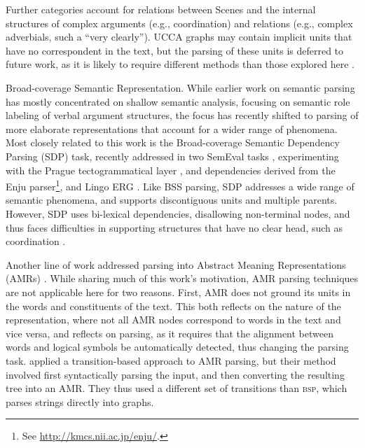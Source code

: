 \documentclass[11pt]{article}
\makeatletter
\renewcommand{\paragraph}{
  \@startsection{paragraph}{4}
  {\z@}{.5ex \@plus .5ex \@minus .2ex}{-1em}
  {\normalfont\normalsize\bfseries}
}
\makeatother
\begin{document}
Further categories account for relations between Scenes and the internal structures of
complex arguments (e.g., coordination) and relations
(e.g., complex adverbials, such a ``very clearly''). UCCA graphs may contain implicit
units that have no correspondent in the text, but the parsing of these
units is deferred to future work, as it is likely to require different methods
than those explored here \cite{roth2015inducing}.


\paragraph{Broad-coverage Semantic Representation.}
While earlier work on semantic parsing has mostly concentrated on shallow semantic analysis,
focusing on semantic role labeling of verbal argument structures,
the focus has recently shifted to parsing of more elaborate representations that account
for a wider range of phenomena. 
Most closely related to this work is the Broad-coverage Semantic Dependency Parsing (SDP) task,
recently addressed in two SemEval tasks \cite{oepen2014semeval,oepen2015semeval},
experimenting with the Prague tectogrammatical layer \cite{bohmova2003prague},
and dependencies derived from the Enju parser\footnote{See \url{http://kmcs.nii.ac.jp/enju/}.},
and Lingo ERG \cite{Flic:02}.
Like BSS parsing, SDP addresses a wide range of semantic phenomena,
and supports discontiguous units and multiple parents. However, SDP uses
bi-lexical dependencies, disallowing non-terminal nodes, and thus faces difficulties in supporting
structures that have no clear head, such as coordination \cite{Ivanova2012who}.

Another line of work addressed parsing into Abstract Meaning Representations (AMRs)
\cite{flanigan2014discriminative,vanderwende2015amr,pust2015parsing,artzi2015broad}. 
While sharing much of this work's motivation, AMR parsing techniques are not applicable
here for two reasons. 
First, AMR does not ground its units in the words and constituents of the text.
This both reflects on the nature of the representation,
where not all AMR nodes correspond to words in the text and vice versa, and reflects
on parsing, as it requires that the alignment between words and logical symbols be
automatically detected, thus changing the parsing task.
 applied a transition-based approach to AMR parsing,
but their method involved first syntactically parsing the input, and then converting
the resulting tree into an AMR. They thus used a different set of transitions than
\textsc{bsp}, which parses strings directly into graphs.
\end{document}

